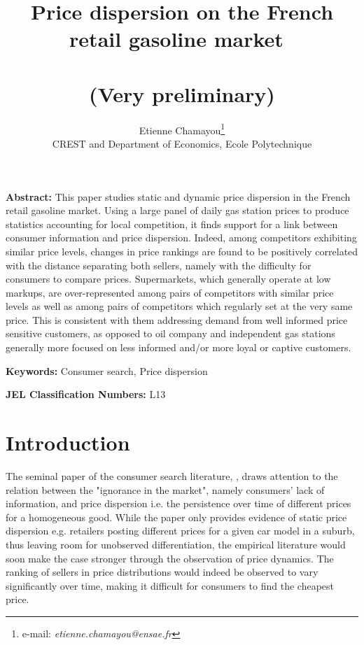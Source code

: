 \documentclass[english]{article}
\begin{document}
\title{Price dispersion on the French retail gasoline market\ \\ \ \\(Very preliminary)}
\author{Etienne Chamayou\thanks{e-mail:
\textit{etienne.chamayou@ensae.fr}}\medskip\\{\normalsize CREST and Department of Economics, Ecole Polytechnique }}
\maketitle

\sloppy%

\onehalfspacing

\textbf{Abstract:}
This paper studies static and dynamic price dispersion in the French retail gasoline market. Using a large panel of daily gas station prices to produce statistics accounting for local competition, it finds support for a link between consumer information and price dispersion. Indeed, among competitors exhibiting similar price levels, changes in price rankings are found to be positively correlated with the distance separating both sellers, namely with the difficulty for consumers to compare prices. Supermarkets, which generally operate at low markups, are over-represented among pairs of competitors with similar price levels as well as among pairs of competitors which regularly set at the very same price. This is consistent with them addressing demand from well informed price sensitive customers, as opposed to oil company and independent gas stations generally more focused on less informed and/or more loyal or captive customers.

\strut

\textbf{Keywords:} Consumer search, Price dispersion

\strut

\textbf{JEL Classification Numbers:} L13

\pagebreak%

\section{Introduction}

The seminal paper of the consumer search literature, \cite{STI61}, draws attention to the relation between the "ignorance in the market", namely consumers' lack of information, and price dispersion i.e. the persistence over time of different prices for a homogeneous good. While the paper only provides evidence of static price dispersion e.g. retailers posting different prices for a given car model in a suburb, thus leaving room for unobserved differentiation, the empirical literature would soon make the case stronger through the observation of price dynamics. The ranking of sellers in price distributions would indeed be observed to vary significantly over time, making it difficult for consumers to find the cheapest price.
\end{document}

